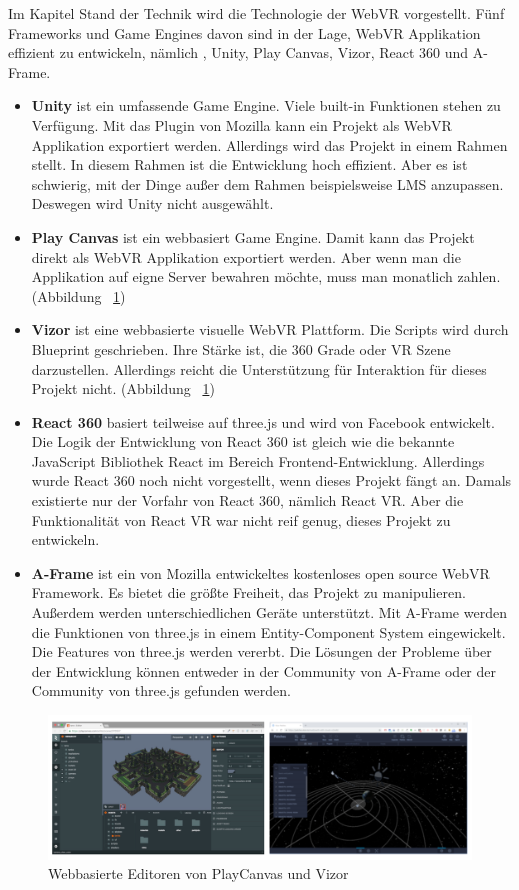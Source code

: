  Im Kapitel Stand der Technik wird die Technologie der WebVR vorgestellt. Fünf Frameworks und Game Engines davon sind in der Lage, WebVR Applikation effizient zu entwickeln, nämlich , Unity, Play Canvas, Vizor, React 360 und A-Frame.
 
 \begin{itemize}
     \item \textbf{Unity} ist ein umfassende Game Engine. Viele built-in Funktionen stehen zu Verfügung. Mit das Plugin von Mozilla kann ein Projekt als WebVR Applikation exportiert werden. Allerdings wird das Projekt in einem Rahmen stellt. In diesem Rahmen ist die Entwicklung hoch effizient. Aber es ist schwierig, mit der Dinge außer dem Rahmen beispielsweise LMS anzupassen. Deswegen wird Unity nicht ausgewählt.
     \item \textbf{Play Canvas} ist ein webbasiert Game Engine. Damit kann das Projekt direkt als WebVR Applikation exportiert werden. Aber wenn man die Applikation auf eigne Server bewahren möchte, muss man monatlich zahlen. (Abbildung ~\ref{fig:Webbasierte Engine})
     \item \textbf{Vizor} ist eine webbasierte visuelle WebVR Plattform. Die Scripts wird durch Blueprint geschrieben. Ihre Stärke ist, die 360 Grade oder VR Szene darzustellen. Allerdings reicht die Unterstützung für Interaktion für dieses Projekt nicht. (Abbildung ~\ref{fig:Webbasierte Engine})
     \item \textbf{React 360} basiert teilweise auf three.js und wird von Facebook entwickelt. Die Logik der Entwicklung von React 360 ist gleich wie die bekannte JavaScript Bibliothek React im Bereich Frontend-Entwicklung. Allerdings wurde React 360 noch nicht vorgestellt, wenn dieses Projekt fängt an. Damals existierte nur der Vorfahr von React 360, nämlich React VR. Aber die Funktionalität von React VR war nicht reif genug, dieses Projekt zu entwickeln.
     \item \textbf{A-Frame} ist ein von Mozilla entwickeltes kostenloses open source WebVR Framework. Es bietet die größte Freiheit, das Projekt zu manipulieren. Außerdem werden unterschiedlichen Geräte unterstützt. Mit A-Frame werden die Funktionen von three.js in einem Entity-Component System eingewickelt. Die Features von three.js werden vererbt. Die Lösungen der Probleme über der Entwicklung können entweder in der Community von A-Frame oder der Community von three.js gefunden werden.
 \end{itemize}
 
\begin{figure}[ht]
\centering
\includegraphics[width=\textwidth]{images/playCanvasVizor.png}
\caption[Webbasierte Engine]{Webbasierte Editoren von PlayCanvas und Vizor}
\label{fig:Webbasierte Engine}
\end{figure}

